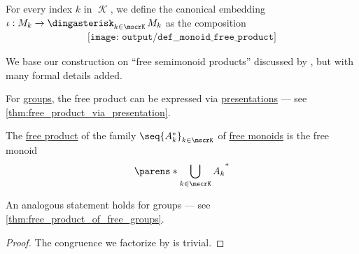 \begin{definition}
  For every index \( k \) in \( \mscrK \), we define the canonical embedding \( \iota: M_k \to \Ast_{k \in \mscrK} M_k \) as the composition
  \begin{equation}\label{eq:def:monoid_free_product/embedding}
    \begin{aligned}
      \texttt{[image: output/def\_\_monoid\_free\_product]}
    \end{aligned}
  \end{equation}
\end{definition}
\begin{comments}
  \item We base our construction on \enquote{free semimonoid products} discussed by , but with many formal details added.

  \item For \hyperref[def:group]{groups}, the free product can be expressed via \hyperref[def:group_presentation]{presentations} --- see \cref{thm:free_product_via_presentation}.
\end{comments}

\begin{proposition}\label{thm:free_product_of_free_monoids}
  The \hyperref[def:monoid_free_product]{free product} of the family \( \seq{ A_k^* }_{k \in \mscrK} \) of \hyperref[def:free_monoid]{free monoids} is the free monoid
  \begin{equation*}
    \parens*{ \bigcup_{k \in \mscrK} A_k }^*
  \end{equation*}
\end{proposition}
\begin{comments}
  \item An analogous statement holds for groups --- see \cref{thm:free_product_of_free_groups}.
\end{comments}
\begin{proof}
  The congruence we factorize by is trivial.
\end{proof}

